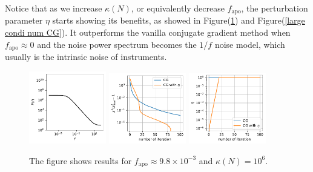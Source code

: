 \documentclass[twocolumn,linenumbers]{aastex631}
\begin{document}
Notice that as we increase $\kappa(N)$, or equivalently decrease
$f_{\text{apo}}$, the perturbation parameter $\eta$ starts showing its 
benefits, as showed in Figure(\ref{medium condi num CG}) and 
Figure(\ref{large condi num CG}).
It outperforms the vanilla conjugate gradient method when 
$f_{\text{apo}} \approx 0$ and the noise power spectrum becomes the $1/f$ noise model,
which usually is the intrinsic noise of instruments\cite{1997PhRvD..56.4514T}.
\begin{figure}[htb!]
\centering
\includegraphics[width=0.3\textwidth]{0.1/medium_condition_num/P_f.pdf}
\includegraphics[width=0.3\textwidth]{0.1/medium_condition_num/chi2_CG.pdf}
\includegraphics[width=0.3\textwidth]{0.1/medium_condition_num/eta_CG.pdf}
\caption{The figure shows results for $f_{\text{apo}}\approx 9.8\times10^{-3}$ 
    and $\kappa(N) = 10^6$.
}
\label{medium condi num CG}
\end{figure}
\end{document}
